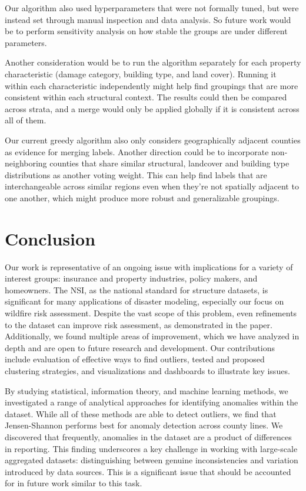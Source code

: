 \documentclass[11pt,letterpaper]{article}
\begin{document}
Our algorithm also used hyperparameters that were not formally tuned, but were instead set through manual inspection and data analysis. So future work would be to perform sensitivity analysis on how stable the groups are under different parameters.

Another consideration would be to run the algorithm separately for each property characteristic (damage category, building type, and land cover). Running it within each characteristic independently might help find groupings that are more consistent within each structural context. The results could then be compared across strata, and a merge would only be applied globally if it is consistent across all of them.

Our current greedy algorithm also only considers geographically adjacent counties as evidence for merging labels. Another direction could be to incorporate non-neighboring counties that share similar structural, landcover and building type distributions as another voting weight. This can help find labels that are interchangeable across similar regions even when they're not spatially adjacent to one another, which might produce more robust and generalizable groupings.

\section{Conclusion}

Our work is representative of an ongoing issue with implications for a variety of interest groups: insurance and property industries, policy makers, and homeowners. The NSI, as the national standard for structure datasets, is significant for many applications of disaster modeling, especially our focus on wildfire risk assessment. Despite the vast scope of this problem, even refinements to the dataset can improve risk assessment, as demonstrated in the \cite{pollacknsi} paper. Additionally, we found multiple areas of improvement, which we have analyzed in depth and are open to future research and development. Our contributions include evaluation of effective ways to find outliers, tested and proposed clustering strategies, and visualizations and dashboards to illustrate key issues. 

By studying statistical, information theory, and machine learning methods, we investigated a range of analytical approaches for identifying anomalies within the dataset. While all of these methods are able to detect outliers, we find that Jensen-Shannon performs best for anomaly detection across county lines. We discovered that frequently, anomalies in the dataset are a product of differences in reporting. This finding underscores a key challenge in working with large-scale aggregated datasets: distinguishing between genuine inconsistencies and variation introduced by data sources. This is a significant issue that should be accounted for in future work similar to this task.
\end{document}
